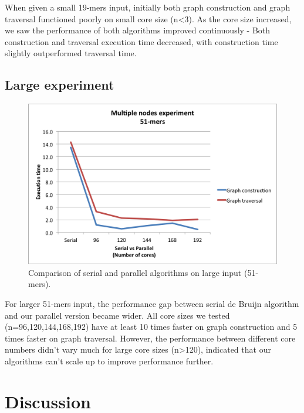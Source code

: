 \documentclass{article}
\begin{document}
When given a small 19-mers input, initially both graph construction and graph traversal functioned poorly on small core size (n<3). As the core size increased, we saw the performance of both algorithms improved continuously - Both construction and traversal execution time decreased, with construction time slightly outperformed traversal time.
\subsection{Large experiment}

\begin{figure}
  \includegraphics[width=\textwidth]{plots/Result_multiple_large.png}
  \caption{Comparison of serial and parallel algorithms on large input (51-mers).}
  \label{fig:all}
\end{figure}

For larger 51-mers input, the performance gap between serial de Bruijn algorithm and our parallel version became wider. All core sizes we tested (n=96,120,144,168,192) have at least 10 times faster on graph construction and 5 times faster on graph traversal. However, the performance between different core numbers didn't vary much for large core sizes (n>120), indicated that our algorithms can't scale up to improve performance further.    

\section{Discussion}
\end{document}
